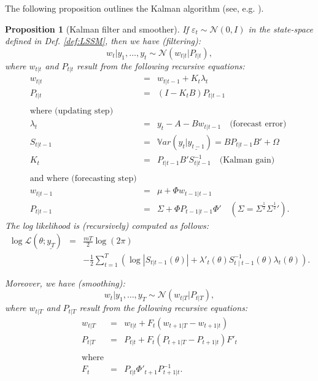\documentclass[
  12pt,
]{book}
\newtheorem{proposition}{Proposition}[chapter]
\theoremstyle{definition}
\theoremstyle{definition}
\theoremstyle{definition}
\theoremstyle{definition}
\theoremstyle{remark}
\begin{document}
The following proposition outlines the Kalman algorithm (see, e.g. \citet{Kim_Nelson_1999}).

\begin{proposition}[Kalman filter and smoother]
\protect\hypertarget{prp:KF}{}\label{prp:KF}If \(\varepsilon_t \sim \mathcal{N}(0,I)\) in the state-space defined in Def. \ref{def:LSSM}, then we have (\emph{filtering}):
\[
w_t|y_1,\dots,y_t \sim  \mathcal{N}(w_{t|t}|P_{t|t}),
\]
where \(w_{t|t}\) and \(P_{t|t}\) result from the following recursive equations:
\[
\boxed{
\begin{array}{ccl}
w_{t|t} &=& w_{t|t-1} + K_t \lambda_t\\
P_{t|t} &=& (I - K_t B)P_{t|t-1} \\ \\
\mbox{where (updating step)} \\
\lambda_t &=& y_t - A - Bw_{t|t-1}  \quad \mbox{(forecast error)}\\
S_{t|t-1} &=& \mathbb{V}ar(y_t|\underline{y_{t-1}}) = B P_{t|t-1} B' + \Omega\\
K_t &=& P_{t|t-1}B'S_{t|t-1}^{-1} \quad \mbox{(Kalman gain)} \\ \\
\mbox{and where (forecasting step)} \\
w_{t|t-1} &=& \mu + \Phi w_{t-1|t-1} \\
P_{t|t-1} &=& \Sigma + \Phi P_{t-1|t-1} \Phi' \quad (\Sigma = \Sigma^{\frac{1}{2}}{\Sigma^{\frac{1}{2}}}').
\end{array}
}
\]
The log likelihood is (recursively) computed as follows:
\begin{eqnarray}
\log \mathcal{L}(\theta;\underline{y_T}) &=& \frac{mT}{2}\log\left(2\pi\right) \label{eq:logLikKF}\\
&  & -\frac{1}{2}\sum_{t=1}^{T}\left(\log\left|S_{t | t-1}(\theta)\right|+\lambda'_{t}(\theta)S_{t\mid t-1}^{-1}(\theta)\lambda{}_{t}(\theta)\right). \nonumber
\end{eqnarray}

Moreover, we have (\emph{smoothing}):
\[
w_t|y_1,\dots,y_T \sim  \mathcal{N}(w_{t|T}|P_{t|T}),
\]
where \(w_{t|T}\) and \(P_{t|T}\) result from the following recursive equations:
\[
\boxed{
\begin{array}{ccl}
w_{t|T} & = & w_{t|t}+F_{t}(w_{t+1|T}-w_{t+1|t})\\
P_{t|T} & = & P_{t|t}+F_{t}(P_{t+1|T}-P_{t+1|t})F'_{t}\\ \\
\mbox{where} \\
F_{t} &=& P_{t|t}\Phi'_{t+1}P_{t+1|t}^{-1}.
\end{array}
}
\]
\end{proposition}
\end{document}
